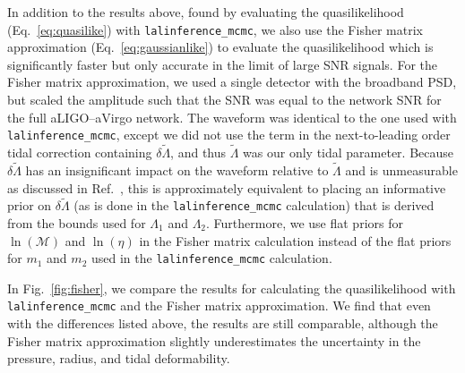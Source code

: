 \documentclass[twocolumn,prd,amssymb,aps,nofootinbib,showpacs,epsf]{revtex4}
\begin{document}
In addition to the results above, found by evaluating the quasilikelihood (Eq.~\eqref{eq:quasilike}) with \texttt{lalinference\_mcmc}, we also use the Fisher matrix approximation (Eq.~\eqref{eq:gaussianlike}) to evaluate the quasilikelihood which is significantly faster but only accurate in the limit of large SNR signals. For the Fisher matrix approximation, we used a single detector with the broadband PSD, but scaled the amplitude such that the SNR was equal to the network SNR for the full aLIGO--aVirgo network. The waveform was identical to the one used with \texttt{lalinference\_mcmc}, except we did not use the term in the next-to-leading order tidal correction containing $\delta\tilde\Lambda$, and thus $\tilde\Lambda$ was our only tidal parameter. Because $\delta\tilde\Lambda$ has an insignificant impact on the waveform relative to $\tilde\Lambda$ and is unmeasurable as discussed in Ref.~\cite{WadeCreightonOchsner2014}, this is approximately equivalent to placing an informative prior on $\delta\tilde\Lambda$ (as is done in the \texttt{lalinference\_mcmc} calculation) that is derived from the bounds used for $\Lambda_1$ and $\Lambda_2$. Furthermore, we use flat priors for $\ln(\mathcal{M})$ and $\ln(\eta)$ in the Fisher matrix calculation instead of the flat priors for $m_1$ and $m_2$ used in the \texttt{lalinference\_mcmc} calculation.

In Fig.~\ref{fig:fisher}, we compare the results for calculating the quasilikelihood with \texttt{lalinference\_mcmc} and the Fisher matrix approximation.  We find that even with the differences listed above, the results are still comparable, although the Fisher matrix approximation slightly underestimates the uncertainty in the pressure, radius, and tidal deformability.
\end{document}
